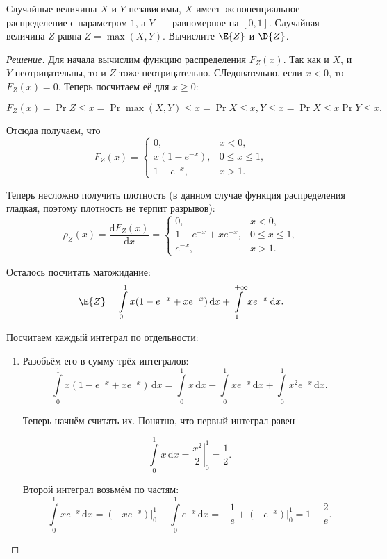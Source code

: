 \begin{problem}
	Случайные величины \(X\) и \(Y\) независимы, \(X\) имеет экспоненциальное распределение с параметром \(1\), а \(Y\)~--- равномерное на \([0, 1]\). Случайная величина \(Z\) равна \(Z = \max(X, Y)\). Вычислите \(\E{Z}\) и \(\D{Z}\).
\end{problem}
\begin{proof}[Решение]
	Для начала вычислим функцию распределения \(F_{Z}(x)\). Так как и \(X\), и \(Y\) неотрицательны, то и \(Z\) тоже неотрицательно. СЛедовательно, если \(x < 0\), то \(F_{Z}(x) = 0\). Теперь посчитаем её для \(x \geq 0\):
	
	\[F_{Z}(x) = \Pr{Z \leq x} = \Pr{\max(X, Y) \leq x} = \Pr{X \leq x, Y \leq x} = \Pr{X \leq x}\Pr{Y \leq x}.\]
	
	Отсюда получаем, что
	\[F_{Z}(x) = \begin{cases}
	0,& x < 0, \\
	x(1 - e^{-x}),& 0 \leq x \leq 1, \\
	1 - e^{-x},& x > 1.
	\end{cases}\]
	
	Теперь несложно получить плотность (в данном случае функция распределения гладкая, поэтому плотность не терпит разрывов):
	\[\rho_{Z}(x) = \frac{\mathrm{d}F_{Z}(x)}{\mathrm{d}x} =\begin{cases}
	0,& x < 0, \\
	1 - e^{-x} + xe^{-x},& 0 \leq x \leq 1, \\
	e^{-x},& x > 1.
	\end{cases}\]
	
	Осталось посчитать матожидание:
	\[\E{Z} = \int\limits_{0}^{1} x(1 - e^{-x} + xe^{-x})\,\mathrm{d}x + \int\limits_{1}^{+\infty}xe^{-x}\,\mathrm{d}x.\]
	
	Посчитаем каждый интеграл по отдельности:
	\begin{enumerate}
		\item Разобьём его в сумму трёх интегралов:
		\[\int\limits_{0}^{1} x(1 - e^{-x} + xe^{-x})\,\mathrm{d}x = \int\limits_{0}^{1} x\,\mathrm{d}x - \int\limits_{0}^{1} xe^{-x}\,\mathrm{d}x + \int\limits_{0}^{1} x^{2}e^{-x}\,\mathrm{d}x.\]
		
		Теперь начнём считать их. Понятно, что первый интеграл равен 
		
		\[\int\limits_{0}^{1} x\,\mathrm{d}x = \left.\frac{x^2}{2}\right|_{0}^{1} = \frac{1}{2}.\]
		
		Второй интеграл возьмём по частям:
		\[
		\int\limits_{0}^{1} xe^{-x}\,\mathrm{d}x = \left.\left(-xe^{-x}\right)\right|_{0}^{1} + \int\limits_{0}^{1} e^{-x}\,\mathrm{d}x = -\frac{1}{e} + \left.\left(-e^{-x}\right)\right|_{0}^{1} = 1 - \frac{2}{e}.
		\]
		

\end{enumerate}
\end{proof}
